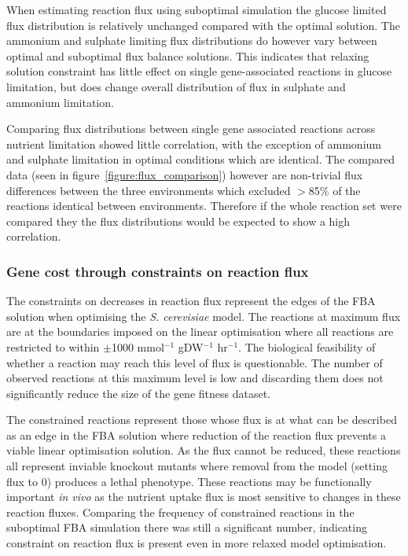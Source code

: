 When estimating reaction flux using suboptimal simulation the glucose limited flux distribution is relatively unchanged compared with the optimal solution. The ammonium and sulphate limiting flux distributions do however vary between optimal and suboptimal flux balance solutions. This indicates that relaxing solution constraint has little effect on single gene-associated reactions in glucose limitation, but does change overall distribution of flux in sulphate and ammonium limitation.

Comparing flux distributions between single gene associated reactions across nutrient limitation showed little correlation, with the exception of ammonium and sulphate limitation in optimal conditions which are identical. The compared data (seen in figure~\vref{figure:flux_comparison}) however are non-trivial flux differences between the three environments which excluded $>$85\% of the reactions identical between environments. Therefore if the whole reaction set were compared they the flux distributions would be expected to show a high correlation.

\subsubsection{Gene cost through constraints on reaction flux}%

The constraints on decreases in reaction flux represent the edges of the FBA solution when optimising the \emph{S. cerevisiae} model. The reactions at maximum flux are at the boundaries imposed on the linear optimisation where all reactions are restricted to within $\pm$1000 mmol$^{-1}$ gDW$^{-1}$ hr$^{-1}$. The biological feasibility of whether a reaction may reach this level of flux is questionable.  The number of observed reactions at this maximum level is low and discarding them does not significantly reduce the size of the gene fitness dataset.

The constrained reactions represent those whose flux is at what can be described as an edge in the FBA solution where reduction of the reaction flux prevents a viable linear optimisation solution. As the flux cannot be reduced, these reactions all represent inviable knockout mutants where removal from the model (setting flux to 0) produces a lethal phenotype. These reactions may be functionally important \emph{in vivo} as the nutrient uptake flux is most sensitive to changes in these reaction fluxes. Comparing the frequency of constrained reactions in the suboptimal FBA simulation there was still a significant number, indicating constraint on reaction flux is present even in more relaxed model optimisation.

